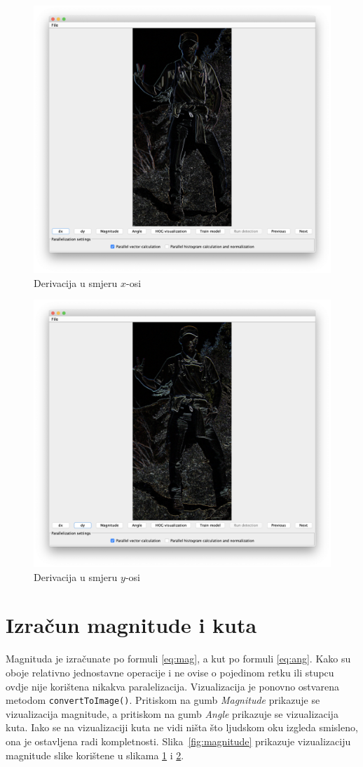 \documentclass[times, utf8, zavrsni]{fer}
\begin{document}
\begin{figure}[htb]
	\centering
	\includegraphics[width=0.75\linewidth]{figures/dx.png}
	\caption{Derivacija u smjeru \(x\)-osi}
	\label{fig:dx}
\end{figure}

\begin{figure}[htb]
	\centering
	\includegraphics[width=0.75\linewidth]{figures/dy.png}
	\caption{Derivacija u smjeru \(y\)-osi}
	\label{fig:dy}
\end{figure}

\section{Izračun magnitude i kuta}
Magnituda je izračunate po formuli \ref{eq:mag}, a kut po formuli \ref{eq:ang}. Kako su oboje relativno jednostavne operacije i ne ovise o pojedinom retku ili stupcu ovdje nije korištena nikakva paralelizacija. Vizualizacija je ponovno ostvarena metodom \verb|convertToImage()|. Pritiskom na gumb \textit{Magnitude} prikazuje se vizualizacija magnitude, a pritiskom na gumb \textit{Angle} prikazuje se vizualizacija kuta. Iako se na vizualizaciji kuta ne vidi ništa što  ljudskom oku izgleda smisleno, ona je ostavljena radi kompletnosti. Slika~\ref{fig:magnitude} prikazuje vizualizaciju magnitude slike korištene u slikama \ref{fig:dx} i \ref{fig:dy}.
\end{document}
